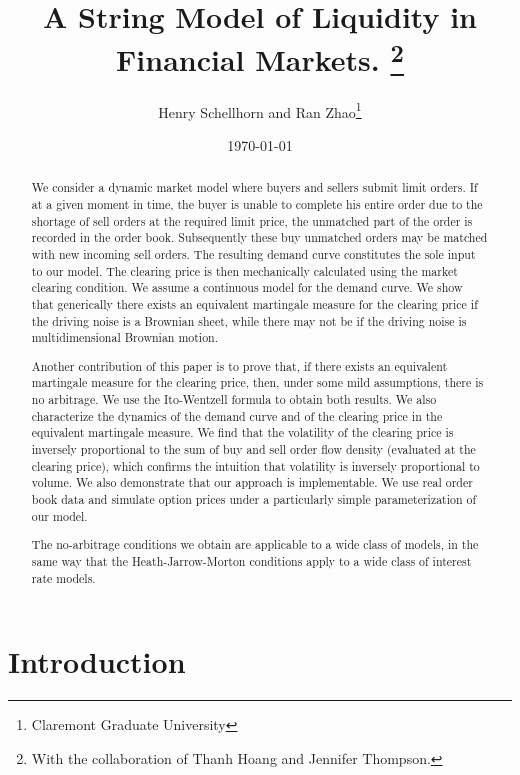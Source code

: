 \documentclass{article}
\begin{document}
\title{A String Model of Liquidity in Financial Markets. \thanks{%
With the collaboration of Thanh Hoang and Jennifer Thompson.}}
\author{Henry Schellhorn and Ran Zhao\thanks{%
Claremont Graduate University}}
\date{\today }
\maketitle

\begin{abstract}
We consider a dynamic market model where buyers and sellers submit limit
orders. If at a given moment in time, the buyer is unable to complete his
entire order due to the shortage of sell orders at the required limit price,
the unmatched part of the order is recorded in the order book. Subsequently
these buy unmatched orders may be matched with new incoming sell orders. The
resulting demand curve constitutes the sole input to our model. The clearing
price is then mechanically calculated using the market clearing condition.
We assume a continuous model for the demand curve. We show that generically
there exists an equivalent martingale measure for the clearing price if the
driving noise is a Brownian sheet, while there may not be if the driving
noise is multidimensional Brownian motion.

Another contribution of this paper is to prove that, if there exists an
equivalent martingale measure for the clearing price, then, under some mild
assumptions, there is no arbitrage. We use the Ito-Wentzell formula to
obtain both results. We also characterize the dynamics of the demand curve
and of the clearing price in the equivalent martingale measure. We find that
the volatility of the clearing price is inversely proportional to the sum of
buy and sell order flow density (evaluated at the clearing price), which
confirms the intuition that volatility is inversely proportional to volume.
We also demonstrate that our approach is implementable. We use real order
book data and simulate option prices under a particularly simple
parameterization of our model.

The no-arbitrage conditions we obtain are applicable to a wide class of
models, in the same way that the Heath-Jarrow-Morton conditions apply to a
wide class of interest rate models.
\end{abstract}

\section{Introduction}
\end{document}
